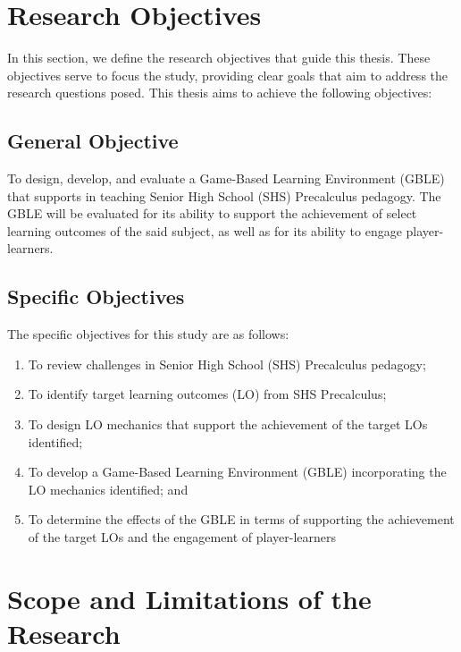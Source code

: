 \section{Research Objectives}
\label{sec:researchobjectives}

In this section, we define the research objectives that guide this thesis. These objectives serve to focus the study, providing clear goals that aim to address the research questions posed. This thesis aims to achieve the following objectives:

\begin{subs}
\subsection{General Objective}
\label{sec:generalobjective}

To design, develop, and evaluate a Game-Based Learning Environment (GBLE) that supports in teaching Senior High School (SHS) Precalculus pedagogy. The GBLE will be evaluated for its ability to support the achievement of select learning outcomes of the said subject, as well as for its ability to engage player-learners.

\subsection{Specific Objectives}
\label{sec:specificobjectives}

The specific objectives for this study are as follows:

\begin{enumerate}
   \item To review challenges in Senior High School (SHS) Precalculus pedagogy;
   \item To identify target learning outcomes (LO) from SHS Precalculus;
   \item To design LO mechanics that support the achievement of the target LOs identified;
   \item To develop a Game-Based Learning Environment (GBLE) incorporating the LO mechanics identified; and
   \item To determine the effects of the GBLE in terms of supporting the achievement of the target LOs and the engagement of player-learners
\end{enumerate}
\end{subs}

\section{Scope and Limitations of the Research}
\label{sec:scopelimitations}

